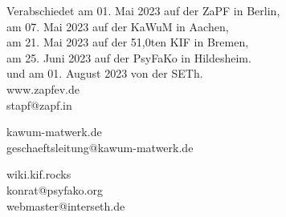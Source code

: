 \documentclass[DIV=calc]{scrartcl}
\begin{document}

\vspace{1cm} 

\vfill
\begin{flushright}
	Verabschiedet am 01. Mai 2023
	auf der ZaPF in Berlin,\\

    am 07. Mai 2023
    auf der KaWuM in Aachen,\\
 
    am  21. Mai 2023
    auf der 51,0ten KIF in Bremen,\\

    am 25. Juni 2023
    auf der PsyFaKo in Hildesheim.\\
    
    und am  01. August 2023
    von der SETh. \\

    \vspace{0.2cm}
    www.zapfev.de\\ stapf@zapf.in

    kawum-matwerk.de\\ geschaeftsleitung@kawum-matwerk.de
 
    wiki.kif.rocks\\ 
    \vspace{0.2cm}
    konrat@psyfako.org\\
    \vspace{0.2cm}
    webmaster@interseth.de\\
 \end{flushright}
\end{document}
